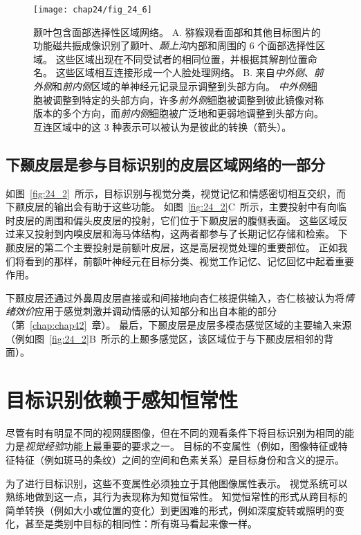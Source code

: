 \begin{figure}[htbp]
	\centering
	\texttt{[image: chap24/fig\_24\_6]}
	\caption{颞叶包含面部选择性区域网络。
		A. 猕猴观看面部和其他目标图片的功能磁共振成像识别了颞叶、\textit{颞上沟}内部和周围的 6 个面部选择性区域。
		这些区域出现在不同受试者的相同位置，并根据其解剖位置命名。
		这些区域相互连接形成一个人脸处理网络。
		B. 来自\textit{中外侧}、\textit{前外侧}和\textit{前内侧}区域的单神经元记录显示调整到头部方向。
		\textit{中外侧}细胞被调整到特定的头部方向，许多\textit{前外侧}细胞被调整到彼此镜像对称版本的多个方向，而\textit{前内侧}细胞被广泛地和更弱地调整到头部方向。
		互连区域中的这 3 种表示可以被认为是彼此的转换（箭头）。}
	\label{fig:24_6}
\end{figure}



\subsection{下颞皮层是参与目标识别的皮层区域网络的一部分}

如图~\ref{fig:24_2}~所示，目标识别与视觉分类，视觉记忆和情感密切相互交织，而下颞皮层的输出会有助于这些功能。
如图~\ref{fig:24_2}C~所示，主要投射中有向临时皮层的周围和偏头皮皮层的投射，它们位于下颞皮层的腹侧表面。
这些区域反过来又投射到内嗅皮层和海马体结构，这两者都参与了长期记忆存储和检索。
下颞皮层的第二个主要投射是前额叶皮层，这是高层视觉处理的重要部位。
正如我们将看到的那样，前额叶神经元在目标分类、视觉工作记忆、记忆回忆中起着重要作用。


下颞皮层还通过外鼻周皮层直接或和间接地向杏仁核提供输入，杏仁核被认为将\textit{情绪效价}应用于感觉刺激并调动情感的认知部分和出自本能的部分（第~\ref{chap:chap42}~章）。
最后，下颞皮层是皮层多模态感觉区域的主要输入来源（例如图~\ref{fig:24_2}B~所示的上颞多感觉区，该区域位于与下颞皮层相邻的背面）。



\section{目标识别依赖于感知恒常性}

尽管有时有明显不同的视网膜图像，但在不同的观看条件下将目标识别为相同的能力是\textit{视觉经验}功能上最重要的要求之一。
目标的不变属性（例如，图像特征或特征特征（例如斑马的条纹）之间的空间和色素关系）是目标身份和含义的提示。


为了进行目标识别，这些不变属性必须独立于其他图像属性表示。
视觉系统可以熟练地做到这一点，其行为表现称为知觉恒常性。
知觉恒常性的形式从跨目标的简单转换（例如大小或位置的变化）到更困难的形式，例如深度旋转或照明的变化，甚至是类别中目标的相同性：所有斑马看起来像一样。



